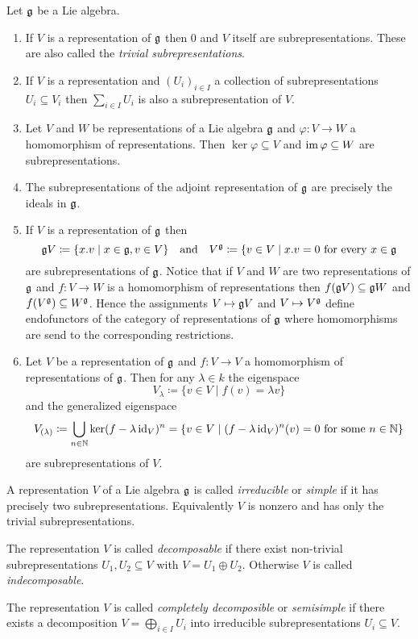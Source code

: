 \begin{examples}
 Let $\mathfrak{g}$ be a Lie algebra.
 \begin{enumerate}[leftmargin=*]
  \item
   If $V$ is a representation of $\mathfrak{g}$ then $0$ and $V$ itself are subrepresentations. These are also called the \emph{trivial subrepresentations}.
  \item
   If $V$ is a representation and $(U_i)_{i \in I}$ a collection of subrepresentations $U_i \subseteq V_i$ then $\sum_{i \in I} U_i$ is also a subrepresentation of $V$.
  \item
   Let $V$ and $W$ be representations of a Lie algebra $\mathfrak{g}$ and $\varphi \colon V \to W$ a homomorphism of representations. Then $\ker \varphi \subseteq V$ and $\operatorname{im} \varphi \subseteq W$ are subrepresentations.
  \item
   The subrepresentations of the adjoint representation of $\mathfrak{g}$ are precisely the ideals in $\mathfrak{g}$.
  \item
   If $V$ is a representation of $\mathfrak{g}$ then
   \[
    \mathfrak{g} V \coloneqq \{x.v \mid x \in \mathfrak{g}, v \in V\}
    \quad\text{and}\quad
    V^{\mathfrak{g}} \coloneqq \{v \in V \mid \text{$x.v = 0$ for every $x \in \mathfrak{g}$}
   \]
   are subrepresentations of $\mathfrak{g}$. Notice that if $V$ and $W$ are two representations of $\mathfrak{g}$ and $f \colon V \to W$ is a homomorphism of representations then $f(\mathfrak{g} V) \subseteq \mathfrak{g} W$ and $f(V^{\mathfrak{g}}) \subseteq W^{\mathfrak{g}}$. Hence the assignments $V \mapsto \mathfrak{g} V$ and $V \mapsto V^{\mathfrak{g}}$ define endofunctors of the category of representations of $\mathfrak{g}$ where homomorphisms are send to the corresponding restrictions.
  \item
   Let $V$ be a representation of $\mathfrak{g}$ and $f \colon V \to V$ a homomorphism of representations of $\mathfrak{g}$. Then for any $\lambda \in k$ the eigenspace
   \[
    V_\lambda \coloneqq \{v \in V \mid f(v) = \lambda v\}
   \]
   and the generalized eigenspace
   \[
    V_{(\lambda)}
    \coloneqq \bigcup_{n \in \mathbb{N}} \ker(f - \lambda \operatorname{id}_V)^n
    = \{v \in V \mid \text{$(f - \lambda \operatorname{id}_V)^n(v) = 0$ for some $n \in \mathbb{N}$}\}
   \]
   are subrepresentations of $V$.
 \end{enumerate}
\end{examples}


\begin{definition}
 A representation $V$ of a Lie algebra $\mathfrak{g}$ is called \emph{irreducible} or \emph{simple} if it has precisely two subrepresentations. Equivalently $V$ is nonzero and has only the trivial subrepresentations.
 
 The representation $V$ is called \emph{decomposable} if there exist non-trivial subrepresentations $U_1, U_2 \subseteq V$ with $V = U_1 \oplus U_2$. Otherwise $V$ is called \emph{indecomposable}.
 
 The representation $V$ is called \emph{completely decomposible} or \emph{semisimple} if there exists a decomposition $V = \bigoplus_{i \in I} U_i$ into irreducible subrepresentations $U_i \subseteq V$.
\end{definition}


